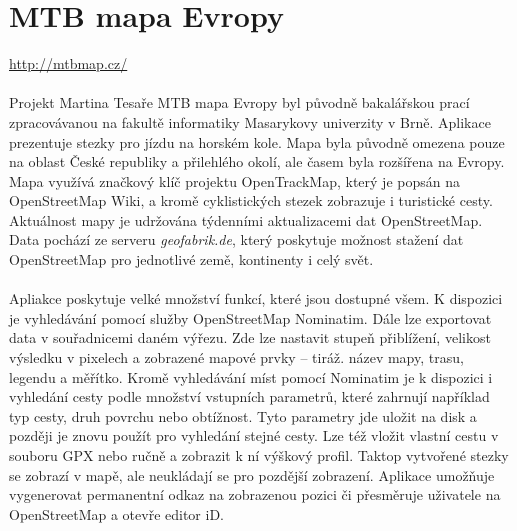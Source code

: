 \documentclass[11pt,a4paper,titlepage,oneside]{book}
\begin{document}
	\section{MTB mapa Evropy}
		\url{http://mtbmap.cz/}
		\paragraph{} Projekt Martina Tesaře MTB mapa Evropy byl původně bakalářskou prací zpracovávanou na fakultě informatiky Masarykovy univerzity v Brně. Aplikace prezentuje stezky pro jízdu na horském kole. Mapa byla původně omezena pouze na oblast České republiky a přilehlého okolí, ale časem byla rozšířena na Evropy. Mapa využívá značkový klíč projektu OpenTrackMap, který je popsán na OpenStreetMap Wiki\cite{otm_klic}, a kromě cyklistických stezek zobrazuje i turistické cesty. Aktuálnost mapy je udržována týdenními aktualizacemi dat OpenStreetMap. Data pochází ze serveru \textit{geofabrik.de}, který poskytuje možnost stažení dat OpenStreetMap pro jednotlivé země, kontinenty i celý svět.
		\paragraph{} Apliakce poskytuje velké množství funkcí, které jsou dostupné všem. K dispozici je vyhledávání pomocí služby OpenStreetMap Nominatim\cite{nominatim}. Dále lze exportovat data v souřadnicemi daném výřezu. Zde lze nastavit stupeň přiblížení, velikost výsledku v pixelech a zobrazené mapové prvky -- tiráž. název mapy, trasu, legendu a měřítko. Kromě vyhledávání míst  pomocí Nominatim je k dispozici i vyhledání cesty podle množství vstupních parametrů, které zahrnují například typ cesty, druh povrchu nebo obtížnost. Tyto parametry jde uložit na disk a později je znovu použít pro vyhledání stejné cesty. Lze též vložit vlastní cestu v souboru GPX nebo ručně a zobrazit k ní výškový profil. Taktop vytvořené stezky se zobrazí v mapě, ale neukládají se pro pozdější zobrazení. Aplikace umožňuje vygenerovat permanentní odkaz na zobrazenou pozici či přesměruje uživatele na OpenStreetMap a otevře editor iD.
\end{document}
